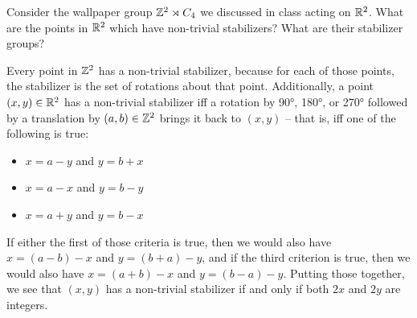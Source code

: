 \documentclass{article}
\begin{document}
\bigskip
\begin{prob}
    Consider the wallpaper group $\mathbb{Z}^2 \rtimes C_4$ we discussed in class acting on $\mathbb{R}^2$. What are the points in $\mathbb{R}^2$ which have non-trivial stabilizers? What are their stabilizer groups?
\end{prob}
Every point in $\mathbb{Z}^2$ has a non-trivial stabilizer, because for each of those points, the stabilizer is the set of rotations about that point. Additionally, a point $(x,y) \in \mathbb{R}^2$ has a non-trivial stabilizer iff a rotation by 90°, 180°, or 270° followed by a translation by $(a,b) \in \mathbb{Z}^2$ brings it back to $(x,y)$ -- that is, iff one of the following is true:
\begin{itemize}
    \item $x=a-y$ and $y=b+x$
    \item $x=a-x$ and $y=b-y$
    \item $x=a+y$ and $y=b-x$
\end{itemize}
If either the first of those criteria is true, then we would also have $x=(a-b)-x$ and $y=(b+a)-y$, and if the third criterion is true, then we would also have $x=(a+b)-x$ and $y=(b-a)-y$. Putting those together, we see that $(x,y)$ has a non-trivial stabilizer if and only if both $2x$ and $2y$ are integers.
\end{document}
